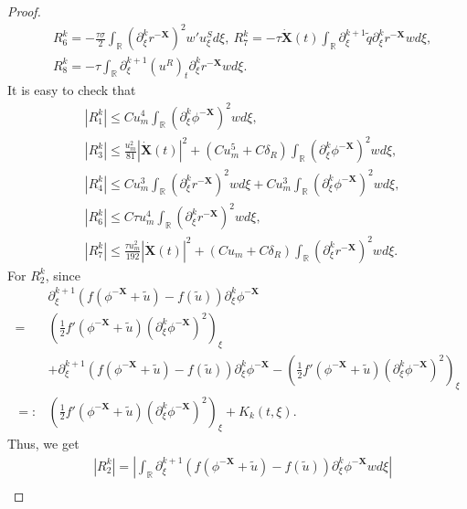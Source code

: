 \documentclass[10pt,reqno]{amsart}
\numberwithin{equation}{section}
\begin{document}
\begin{proof}
\begin{align*}
			&R_6^k=-\frac{\tau\sigma}{2}\int_{\mathbb{R}}(\partial_{\xi}^kr^{-\mathbf{X}})^2w'u_{\xi}^Sd\xi,\ R_7^k=-\tau \dot{\mathbf{X}}(t) \int_{\mathbb{R}}\partial_{\xi}^{k+1}\tilde{q}\partial_{\xi}^kr^{-\mathbf{X}}wd\xi,\\
			&R_8^k=-\tau \int_{\mathbb{R}}\partial_{\xi}^{k+1}\left(u^{R}\right)_{t}\partial_{\xi}^kr^{-\mathbf{X}}wd\xi.
		\end{align*}
		It is easy to check that 
		\begin{equation}
			\begin{aligned}
				&\left|R_1^k\right|\leq Cu_m^4\int_{\mathbb{R}}\left(\partial_{\xi}^k\phi^{-\mathbf{X}}\right)^2wd\xi,\\
				&\left|R_3^k\right|\leq\frac{u_m^2}{81}\left|\dot{\mathbf{X}}(t)\right|^2+\left(Cu_m^5+C\delta_{R}\right)\int_{\mathbb{R}}\left(\partial_{\xi}^k\phi^{-\mathbf{X}}\right)^2wd\xi,\\
				&\left|R_4^k\right|\leq Cu_m^3\int_{\mathbb{R}}\left(\partial_{\xi}^kr^{-\mathbf{X}}\right)^2wd\xi+Cu_m^3\int_{\mathbb{R}}\left(\partial_{\xi}^k\phi^{-\mathbf{X}}\right)^2wd\xi,\\
				&\left|R_6^k\right|\leq  C\tau u_m^4\int_{\mathbb{R}}\left(\partial_{\xi}^kr^{-\mathbf{X}}\right)^2wd\xi,\\
				&\left|R_7^k\right|\leq\frac{\tau u_m^2}{192}\left|\dot{\mathbf{X}}(t)\right|^2+\left(C u_m+C\delta_{R}\right)\int_{\mathbb{R}}\left(\partial_{\xi}^kr^{-\mathbf{X}}\right)^2wd\xi.
			\end{aligned}
		\end{equation}
		For $R_2^k$, since
		\begin{align*}
			&\partial_{\xi}^{k+1}\left(f\left(\phi^{-\mathbf{X}}+\tilde{u}\right)-f\left(\tilde{u}\right)\right)\partial_{\xi}^k\phi^{-\mathbf{X}}\\
			=&\left(\frac{1}{2}f'(\phi^{-\mathbf{X}}+\tilde{u})(\partial_{\xi}^{k}\phi^{-\mathbf{X}})^{2}\right)_{\xi}\\
			&+\partial_{\xi}^{k+1}(f(\phi^{-\mathbf{X}}+\tilde{u})-f(\tilde{u}))\partial_{\xi}^{k}\phi^{-\mathbf{X}}-\left(\frac{1}{2}f'(\phi^{-\mathbf{X}}+\tilde{u})(\partial_{\xi}^{k}\phi^{-\mathbf{X}})^{2}\right)_{\xi}\\
			=:&\left(\frac{1}{2}f'(\phi^{-\mathbf{X}}+\tilde{u})(\partial_{\xi}^{k}\phi^{-\mathbf{X}})^{2}\right)_{\xi}+K_{k}(t,\xi).
		\end{align*}
		Thus, we get 
		\begin{align*}
			&\left|R_2^k\right|
			=\left|\int_{\mathbb{R}}\partial_{\xi}^{k+1}\left(f\left(\phi^{-\mathbf{X}}+\tilde{u}\right)-f\left(\tilde{u}\right)\right)\partial_{\xi}^k\phi^{-\mathbf{X}}wd\xi\right|\\

\end{align*}
\end{proof}
\end{document}
